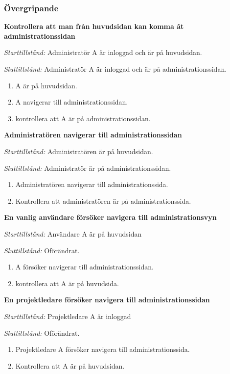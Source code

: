 \documentclass[a4paper]{article}
\begin{document}
\subsubsection{Övergripande}
\begin{FT}
\item %
\textbf{Kontrollera att man från huvudsidan kan komma åt administrationssidan}

\emph{Starttillstånd:}  Administratör A är inloggad och är på huvudsidan.

\emph{Sluttillstånd:} Administratör A är inloggad och är på administrationssidan.

\begin{enumerate}
\item A är på huvudsidan.
\item A navigerar till administrationssidan.
\item kontrollera att A är på administrationssidan. 
\end{enumerate}

\item %
\textbf{Administratören navigerar till administrationssidan}

\emph{Starttillstånd:} Administratören är på huvudsidan.

\emph{Sluttillstånd:} Administratör är på administrationssidan.

\begin{enumerate}
\item Administratören navigerar till administrationssida.
\item Kontrollera att administratören är på administrationssida.
\end{enumerate}

\item %
\textbf{En vanlig användare försöker navigera till administrationsvyn}

\emph{Starttillstånd:} Användare A är på huvudsidan

\emph{Sluttillstånd:} Oförändrat.

\begin{enumerate}
\item A försöker navigerar till administrationssidan.
\item kontrollera att A är på huvudsida. 
\end{enumerate}

\item %
\textbf{En projektledare försöker navigera till administrationssidan}

\emph{Starttillstånd:} Projektledare A är inloggad

\emph{Sluttillstånd:} Oförändrat.

\begin{enumerate}
\item Projektledare A försöker navigera till administrationssida.
\item Kontrollera att A är på huvudsidan.

\end{enumerate}
\end{FT}
\end{document}
